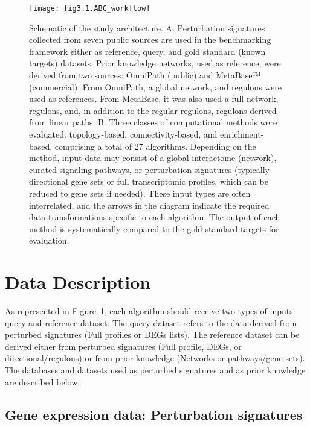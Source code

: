 \begin{figure}[htbp]
    \centering
    \texttt{[image: fig3.1.ABC\_workflow]}
    \caption[Schematic of the study architecture.]{Schematic of the study architecture. A. Perturbation signatures collected from seven public sources are used in the benchmarking framework either as reference, query, and gold standard (known targets) datasets. Prior knowledge networks, used as reference, were derived from two sources: OmniPath (public) and MetaBase™ (commercial). From OmniPath, a global network, and regulons were used as references. From MetaBase, it was also used a full network, regulons, and, in addition to the regular regulons, regulons derived from linear paths. B. Three classes of computational methods were evaluated: topology-based, connectivity-based, and enrichment-based, comprising a total of 27 algorithms. Depending on the method, input data may consist of a global interactome (network), curated signaling pathways, or perturbation signatures (typically directional gene sets or full transcriptomic profiles, which can be reduced to gene sets if needed). These input types are often interrelated, and the arrows in the diagram indicate the required data transformations specific to each algorithm. The output of each method is systematically compared to the gold standard targets for evaluation.}
    \label{fig:fig3.1.ABC_workflow}
\end{figure}


\section{Data Description} %
\label{sec:data_description}

As represented in Figure~\ref{fig:fig3.1.ABC_workflow}, each algorithm should receive two types of inputs: query and reference dataset. The query dataset refers to the data derived from perturbed signatures (Full profiles or DEGs lists). The reference dataset can be derived either from perturbed signatures (Full profile, DEGs, or directional/regulons) or from prior knowledge (Networks or pathways/gene sets). The databases and datasets used as perturbed signatures and as prior knowledge are described below.

\subsection{Gene expression data: Perturbation signatures}
\label{sub:gene_expression_data_perturbation_signatures}

